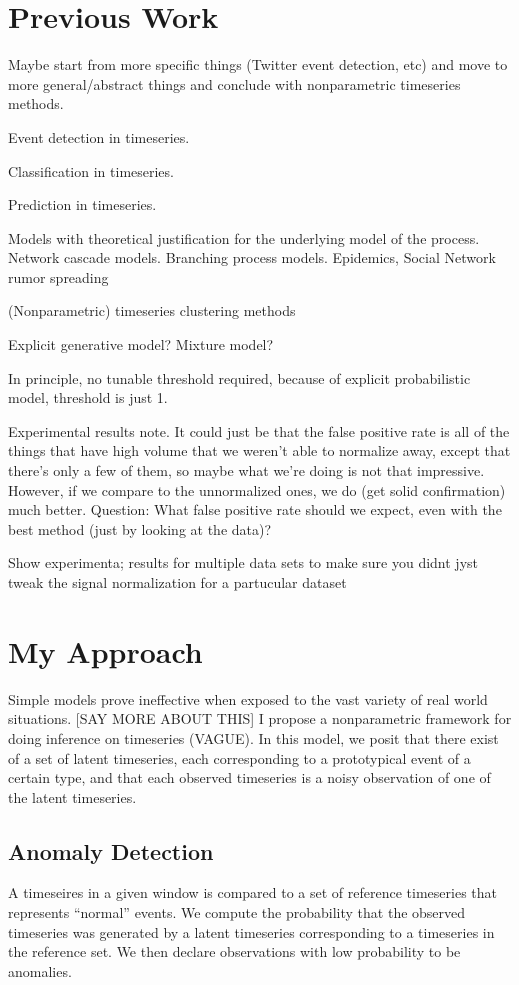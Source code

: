 \section{Previous Work}
Maybe start from more specific things (Twitter event detection, etc) and move to more general/abstract things and conclude with nonparametric timeseries methods.

Event detection in timeseries.

Classification in timeseries.

Prediction in timeseries.

Models with theoretical justification for the underlying model of the process. Network cascade models. Branching process models.
Epidemics, Social Network rumor spreading

(Nonparametric) timeseries clustering methods

Explicit generative model? Mixture model?

In principle, no tunable threshold required, because of explicit probabilistic model, threshold is just 1.

Experimental results note. It could just be that the false positive rate is all of the things that have high volume that we weren't able to normalize away, except that there's only a few of them, so maybe what we're doing is not that impressive. However, if we compare to the unnormalized ones, we do (get solid confirmation) much better. Question: What false positive rate should we expect, even with the best method (just by looking at the data)?


Show experimenta; results for multiple data sets to make sure you didnt jyst tweak the signal normalization for a partucular dataset 

\section{My Approach}
Simple models prove ineffective when exposed to the vast variety of real world situations. [SAY MORE ABOUT THIS] I propose a nonparametric framework for doing inference on timeseries (VAGUE). In this model, we posit that there exist of a set of latent timeseries, each corresponding to a prototypical event of a certain type, and that each observed timeseries is a noisy observation of one of the latent timeseries.

\subsection{Anomaly Detection}
A timeseires in a given window is compared to a set of reference timeseries that represents ``normal'' events. We compute the probability that the observed timeseries was generated by a latent timeseries corresponding to a timeseries in the reference set. We then declare observations with low probability to be anomalies.

